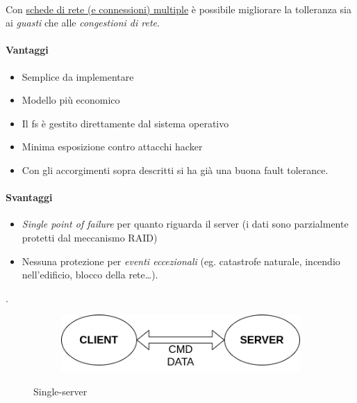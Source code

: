 \documentclass{article}
\begin{document}
\paragraph{} Con \underline{schede di rete (e connessioni) multiple} è possibile migliorare la tolleranza sia ai \emph{guasti} che alle \emph{congestioni di rete}. 

\paragraph{Vantaggi} \begin{itemize}
	\item Semplice da implementare
	\item Modello più economico
	\item Il fs è gestito direttamente dal sistema operativo
	\item Minima esposizione contro attacchi hacker
	\item Con gli accorgimenti sopra descritti si ha già una buona fault tolerance. 
\end{itemize} 

\paragraph{Svantaggi} \begin{itemize}
	\item \emph{Single point of failure} per quanto riguarda il server (i dati sono parzialmente protetti dal meccanismo RAID)
	\item Nessuna protezione per \emph{eventi eccezionali} (eg. catastrofe naturale, incendio nell'edificio, blocco della rete\dots). 
\end{itemize}. 

\begin{figure}[H]
	\centering
	\begin{subfigure}{0.60\linewidth}
		\includegraphics[width=\linewidth]{../diagrams/architettura/1.png}
	\end{subfigure}
	\caption{Single-server}
\end{figure}
\end{document}
